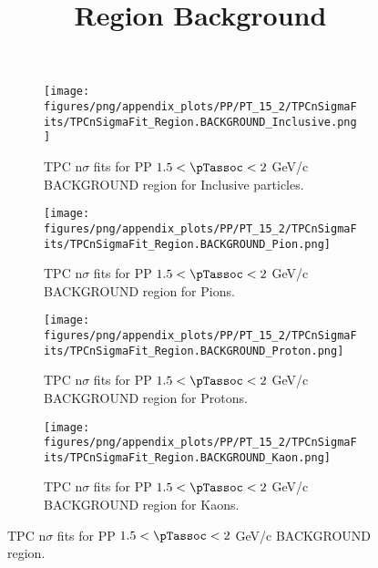             \begin{figure}[H]
                \title{Region Background}
                \begin{subfigure}[b]{0.5\textwidth}
                    \centering
                    \texttt{[image: figures/png/appendix\_plots/PP/PT\_15\_2/TPCnSigmaFits/TPCnSigmaFit\_Region.BACKGROUND\_Inclusive.png]}
                    \caption{TPC n$\sigma$ fits for PP $1.5 < \pTassoc < 2$ GeV/c BACKGROUND region for Inclusive particles.}
                    \label{fig:appendix_PP_$1.5 < \pTassoc < 2$ GeV/c_BACKGROUND_Inclusive}
                \end{subfigure}
                \begin{subfigure}[b]{0.5\textwidth}
                    \centering
                    \texttt{[image: figures/png/appendix\_plots/PP/PT\_15\_2/TPCnSigmaFits/TPCnSigmaFit\_Region.BACKGROUND\_Pion.png]}
                    \caption{TPC n$\sigma$ fits for PP $1.5 < \pTassoc < 2$ GeV/c BACKGROUND region for Pions.}
                    \label{fig:appendix_PP_$1.5 < \pTassoc < 2$ GeV/c_BACKGROUND_Pion}
                \end{subfigure}
                \begin{subfigure}[b]{0.5\textwidth}
                    \centering
                    \texttt{[image: figures/png/appendix\_plots/PP/PT\_15\_2/TPCnSigmaFits/TPCnSigmaFit\_Region.BACKGROUND\_Proton.png]}
                    \caption{TPC n$\sigma$ fits for PP $1.5 < \pTassoc < 2$ GeV/c BACKGROUND region for Protons.}
                    \label{fig:appendix_PP_$1.5 < \pTassoc < 2$ GeV/c_BACKGROUND_Proton}
                \end{subfigure}
                \begin{subfigure}[b]{0.5\textwidth}
                    \centering
                    \texttt{[image: figures/png/appendix\_plots/PP/PT\_15\_2/TPCnSigmaFits/TPCnSigmaFit\_Region.BACKGROUND\_Kaon.png]}
                    \caption{TPC n$\sigma$ fits for PP $1.5 < \pTassoc < 2$ GeV/c BACKGROUND region for Kaons.}
                    \label{fig:appendix_PP_$1.5 < \pTassoc < 2$ GeV/c_BACKGROUND_Kaon}
                \end{subfigure}
                \caption{TPC n$\sigma$ fits for PP $1.5 < \pTassoc < 2$ GeV/c BACKGROUND region.}
                \label{fig:appendix_PP_$1.5 < \pTassoc < 2$ GeV/c_BACKGROUND}
            \end{figure}
            \clearpage
            
